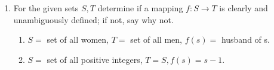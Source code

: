 \renewcommand{\theequation}{\theenumi}

\begin{enumerate}[label=\arabic*.,ref=\thesubsection.\theenumi]

	\item For the given sets $S, T$ determine if a mapping $f:S\to T$ is clearly and unambiguously defined; if not, say why not.
\begin{enumerate}
	\item $S =$ set of all women, $T = $ set of all men, $f(s) = $ husband of s.
	\item $S = $ set of all positive integers, $T = S, f(s) = s-1$.
\end{enumerate}
\end{enumerate}
